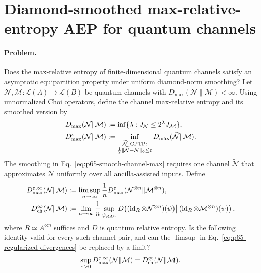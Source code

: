 \section{Diamond-smoothed max-relative-entropy AEP for quantum channels}
\label{sec:op_d754e0d170c01f86}

\paragraph{Problem.}
Does the max-relative entropy of finite-dimensional quantum channels satisfy an
asymptotic equipartition property under uniform diamond-norm smoothing?  Let
$\mathcal N,\mathcal M:\mathcal L(A)\to\mathcal L(B)$ be quantum channels
with $D_{\max}(\mathcal N\|\mathcal M)<\infty$.  Using unnormalized Choi
operators, define the channel max-relative entropy and its smoothed version by
\begin{equation}
  \begin{aligned}
  D_{\max}(\mathcal N\|\mathcal M)
    &:=\inf\{\lambda:J_{\mathcal N}\leq2^\lambda J_{\mathcal M}\},\\
  D_{\max}^{\varepsilon}(\mathcal N\|\mathcal M)
    &:=\inf_{\substack{\widetilde{\mathcal N}\ {\rm CPTP}:\\
              \frac12\|\widetilde{\mathcal N}-\mathcal N\|_\diamond
              \leq\varepsilon}}
       D_{\max}(\widetilde{\mathcal N}\|\mathcal M).
  \end{aligned}
  \label{eq:p65-smooth-channel-max}
\end{equation}
The smoothing in Eq.~\eqref{eq:p65-smooth-channel-max} requires one channel
$\widetilde{\mathcal N}$ that approximates $\mathcal N$ uniformly over all
ancilla-assisted inputs.  Define
\begin{equation}
  \begin{aligned}
  D_{\max}^{\varepsilon,\infty}(\mathcal N\|\mathcal M)
    &:=\limsup_{n\to\infty}\frac1n
       D_{\max}^{\varepsilon}
       (\mathcal N^{\otimes n}\|\mathcal M^{\otimes n}),\\
  D_{\rm ch}^{\infty}(\mathcal N\|\mathcal M)
    &:=\lim_{n\to\infty}\frac1n
      \sup_{\psi_{R A^n}}
      D\!\left((\operatorname{id}_R\otimes\mathcal N^{\otimes n})(\psi)
      \middle\|
      (\operatorname{id}_R\otimes\mathcal M^{\otimes n})(\psi)\right),
  \end{aligned}
  \label{eq:p65-regularized-divergences}
\end{equation}
where $R\simeq A^{\otimes n}$ suffices and $D$ is quantum relative entropy.
Is the following identity valid for every such channel pair, and can the
$\limsup$ in Eq.~\eqref{eq:p65-regularized-divergences} be replaced by a
limit?
\begin{equation}
  \sup_{\varepsilon>0}
  D_{\max}^{\varepsilon,\infty}(\mathcal N\|\mathcal M)
  =D_{\rm ch}^{\infty}(\mathcal N\|\mathcal M).
  \label{eq:p65-channel-aep}
\end{equation}

